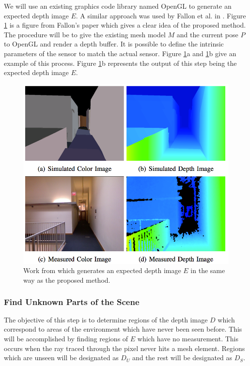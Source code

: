 \documentclass[12pt]{article}
\begin{document}
We will use an existing graphics code library named OpenGL to generate
an expected depth image $E$.  A similar approach was used by Fallon et
al. in  \cite{Fallon2012}.  Figure \ref{fig:proj} is a figure from
Fallon's paper which gives a clear idea of the proposed method. The
procedure will be to give the existing mesh model $M$ and the current
pose $P$ to OpenGL and render a depth buffer. It is possible to define the
intrinsic parameters of the sensor to match the actual sensor. Figure
\ref{fig:proj}a and \ref{fig:proj}b give an example of this process.
Figure \ref{fig:proj}b represents the output of this step being the
expected depth image $E$.   

\begin{figure}[h]
  \centering
    \includegraphics[height=0.7\textwidth]{m_proj.png}
  \caption{Work from \cite{Fallon2012} which generates an expected depth image $E$
in the same way as the proposed method.}
  \label{fig:proj}
\end{figure}

\subsubsection{Find Unknown Parts of the Scene}

The objective of this step is to determine regions of the depth image
$D$ which correspond to areas of the environment which have never been
seen before. This will be accomplished by finding regions of $E$ which
have no measurement. This occurs when the ray traced through the pixel
never hits a mesh element. Regions which are unseen will be designated
as $D_U$ and the rest will be designated as $D_S$. 
\end{document}
